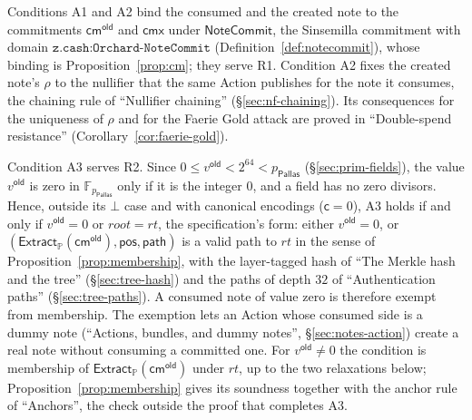 \documentclass[11pt,a4paper]{article}
\theoremstyle{definition}
\newcommand{\F}{\mathbb{F}}
\newcommand{\PP}{\mathbb{P}}
\newcommand{\cmsym}{\mathsf{cm}}
\newcommand{\cmx}{\mathsf{cmx}}
\newcommand{\Pallas}{\ensuremath{\mathsf{Pallas}}}
\newcommand{\NoteCommit}{\ensuremath{\mathsf{NoteCommit}}}
\newcommand{\Extract}{\ensuremath{\mathsf{Extract}}}
\begin{document}
Conditions A1 and A2 bind the consumed and the created note to the
commitments $\cmsym^{\mathsf{old}}$ and $\cmx$ under $\NoteCommit$, the
Sinsemilla commitment with domain $\texttt{z.cash:Orchard-NoteCommit}$
(Definition~\ref{def:notecommit}), whose binding is
Proposition~\ref{prop:cm}; they serve R1. Condition A2 fixes the created
note's $\rho$ to the nullifier that the same Action publishes for the note it
consumes, the chaining rule of ``Nullifier chaining''
(\S\ref{sec:nf-chaining}). Its consequences for the uniqueness of $\rho$ and
for the Faerie Gold attack are proved in ``Double-spend resistance''
(Corollary~\ref{cor:faerie-gold}).

Condition A3 serves R2. Since $0 \le v^{\mathsf{old}} < 2^{64} < p_{\Pallas}$
(\S\ref{sec:prim-fields}), the value $v^{\mathsf{old}}$ is zero in
$\F_{p_{\Pallas}}$ only if it is the integer $0$, and a field has no zero
divisors. Hence, outside its $\bot$ case and with canonical encodings
($\mathsf{c} = 0$), A3 holds if and only if $v^{\mathsf{old}} = 0$ or
$\mathit{root} = \mathit{rt}$, the specification's form: either
$v^{\mathsf{old}} = 0$, or
$(\Extract_{\PP}(\cmsym^{\mathsf{old}}), \mathsf{pos}, \mathsf{path})$ is a
valid path to $\mathit{rt}$ in the sense of Proposition~\ref{prop:membership},
with the layer-tagged hash of ``The Merkle hash and the tree''
(\S\ref{sec:tree-hash}) and the paths of depth $32$ of ``Authentication
paths'' (\S\ref{sec:tree-paths}). A consumed note of value zero is therefore
exempt from membership. The exemption lets an Action whose consumed side is a
dummy note (``Actions, bundles, and dummy notes'', \S\ref{sec:notes-action})
create a real note without consuming a committed one. For
$v^{\mathsf{old}} \neq 0$ the condition is membership of
$\Extract_{\PP}(\cmsym^{\mathsf{old}})$ under $\mathit{rt}$, up to the two
relaxations below; Proposition~\ref{prop:membership} gives its soundness
together with the anchor rule of ``Anchors'', the check outside the proof
that completes A3.
\end{document}
